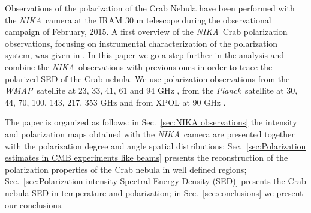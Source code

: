 \documentclass[twocolumn,traditabstract]{aa}
\def\NIKA{\textit{NIKA}}
\def\Planck{\textit{Planck}}
\def\WMAP{\textit{WMAP}}
\begin{document}
Observations of the polarization of the Crab Nebula have been performed with the
\NIKA\ camera \citep{monfardini2010,catalano2014,monfardini2014} at the IRAM 30
m telescope during the observational campaign of February, 2015. A first
overview of the \NIKA\ Crab polarization observations, focusing on instrumental characterization of the polarization system, was given in
\cite{2016JLTP..184..724R}. In this paper we go a step further in the analysis
and combine the \NIKA\ observations with previous ones in order to trace the
polarized SED of the Crab nebula. We use polarization observations from the \WMAP\
satellite at 23, 33, 41, 61 and 94 GHz \citep{2011ApJS..192...19W}, from the
\Planck\ satellite at 30, 44, 70, 100, 143, 217, 353 GHz and from XPOL at 90 GHz
\citep{aumont2010}. 

The paper is organized as follows: in Sec.~\ref{sec:NIKA observations} the
intensity and polarization maps obtained with the \NIKA\ camera are presented
together with the polarization degree and angle spatial distributions;
Sec.~\ref{sec:Polarization estimates in CMB experiments like beams} presents the
reconstruction of the polarization properties of the Crab nebula in well defined
regions; Sec.~\ref{sec:Polarization intensity Spectral Energy Density (SED)}
presents the Crab nebula SED in temperature and polarization; in
Sec.~\ref{sec:conclusions} we present our conclusions.
\end{document}
